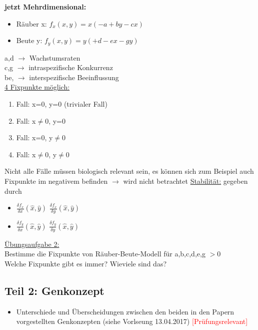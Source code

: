 \textbf{jetzt Mehrdimensional:}
\begin{itemize}
	\item Räuber x: $f_x(x,y)=x(-a+by-cx)$
	\item Beute y: $f_y(x,y)=y(+d-ex-gy)$
\end{itemize}

a,d $\rightarrow$ Wachstumsraten\\
c,g $\rightarrow$ intraspezifische Konkurrenz\\
be, $\rightarrow$ interspezifische Beeinflussung\\

\underline{4 Fixpunkte möglich:}
\begin{enumerate}
	\item Fall: x=0, y=0 (trivialer Fall)
	\item Fall: x$\neq$0, y=0
	\item Fall: x=0, y$\neq$0
	\item Fall: x$\neq$0, y$\neq$0
\end{enumerate}

Nicht alle Fälle müssen biologisch relevant sein, es können sich zum Beispiel auch Fixpunkte im negativem befinden $\rightarrow$ wird nicht betrachtet
\newpage
\underline{Stabilität:} gegeben durch 
\begin{itemize}
	\item $\frac{\delta f_x}{\delta x}(\hat{x}, \hat{y})$ $\frac{\delta f_x}{\delta y}(\hat{x}, \hat{y})$
	\item $\frac{\delta f_y}{\delta x}(\hat{x}, \hat{y})$ $\frac{\delta f_y}{\delta y}(\hat{x}, \hat{y})$
\end{itemize}

\underline{Übungsaufgabe 2:}\\
Bestimme die Fixpunkte von Räuber-Beute-Modell für a,b,c,d,e,g $>$0\\
Welche Fixpunkte gibt es immer? Wieviele sind das?

\subsection{Teil 2: Genkonzept}

\begin{itemize}
	\item Unterschiede und Überscheidungen zwischen den beiden in den Papern vorgestellten Genkonzepten (siehe Vorlseung 13.04.2017) \textcolor{red}{[Prüfungsrelevant]}
\end{itemize}